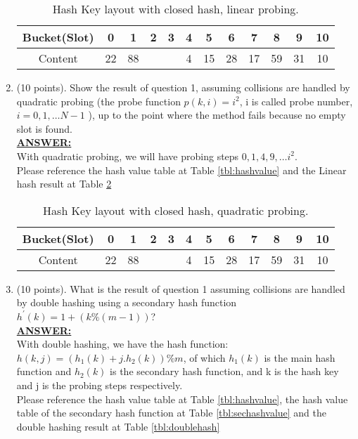 \documentclass{article}
\newcommand{\answer}{\textbf{\\\underline{ANSWER:}\\}}
\begin{document}
\begin{enumerate}
\begin{table}[H]
  \begin{center}
    \begin{tabular}{|c|c|c|c|c|c|c|c|c|c|c|c|} 
      \hline Bucket(Slot)&0&1&2&3&4&5&6&7&8&9&10 \\
      \hline 
      Content &22&88& & &4&15&28&17&59&31&10 \\
      \hline
    \end{tabular}
    \caption{Hash Key layout with closed hash, linear
      probing. \label{tbl:linearhash}}
    \vspace{-15pt}
  \end{center}
\end{table}

\item(10 points). Show the result of question 1, assuming collisions
  are handled by quadratic probing (the probe function $p(k,i) = i^2$,
  i is called probe number, $i=0, 1,\ldots N-1$ ),  up to the point where
  the method fails because no empty slot is found. 
\answer With quadratic probing, we will have probing steps $0, 1, 4, 9,
\ldots i^2$. \\
Please reference the hash value table at Table
\ref{tbl:hashvalue} and the Linear hash result at Table \ref{tbl:quadhash}
\begin{table}[H]
  \begin{center}
    \begin{tabular}{|c|c|c|c|c|c|c|c|c|c|c|c|} 
      \hline Bucket(Slot)&0&1&2&3&4&5&6&7&8&9&10 \\
      \hline 
      Content &22&88& & &4&15&28&17&59&31&10 \\
      \hline
    \end{tabular}
    \caption{Hash Key layout with closed hash, quadratic
      probing. \label{tbl:quadhash}}
    \vspace{-15pt}
  \end{center}
\end{table}

\item(10 points). What is the result of question 1 assuming collisions
  are handled by double hashing using a secondary hash function 
  $h^\prime (k) = 1 + (k \% (m-1))$?
\answer With double hashing, we have the hash function:
$h(k,j)=(h_1(k)+j.h_2(k))\%m$, of which $h_1(k)$ is the main hash
function and $h_2(k)$ is the secondary hash function, and k is the
hash key and j is the probing steps respectively. \\
Please reference the hash value table at Table
\ref{tbl:hashvalue}, the hash value table of the secondary hash
function at Table \ref{tbl:sechashvalue} and the double hashing result at
Table \ref{tbl:doublehash} 


\end{enumerate}
\end{document}
